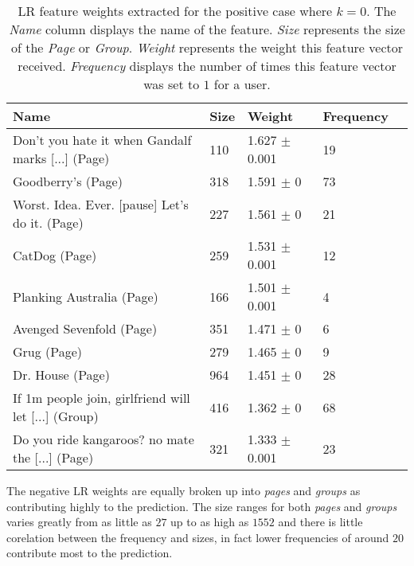 \begin{table}[h]
\begin{minipage}[b]{1.0\textwidth}
\centering
  \begin{tabular}{|l|l|l|l|l|} %
  \hline
  \textbf{Name} & \textbf{Size} & \textbf{Weight} & \textbf{Frequency} \\ \hline

\small{Don't you hate it when Gandalf marks [...] (Page)} & 110 & 1.627 $\pm$ 0.001 & 19 \\ \hline
\small{Goodberry's (Page)} & 318 & 1.591 $\pm$ 0 & 73 \\ \hline
\small{Worst. Idea. Ever. [pause] Let's do it. (Page)} & 227 & 1.561 $\pm$ 0 & 21 \\ \hline
\small{CatDog (Page)} & 259 & 1.531 $\pm$ 0.001 & 12 \\ \hline
\small{Planking Australia (Page)} & 166 & 1.501 $\pm$ 0.001 & 4 \\ \hline
\small{Avenged Sevenfold (Page)} & 351 & 1.471 $\pm$ 0 & 6 \\ \hline
\small{Grug (Page)} & 279 & 1.465 $\pm$ 0 & 9 \\ \hline
\small{Dr. House (Page)} & 964 & 1.451 $\pm$ 0 & 28 \\ \hline
\small{If 1m people join, girlfriend will let [...] (Group)} & 416 & 1.362 $\pm$ 0 & 68 \\ \hline
\small{Do you ride kangaroos? no mate the [...] (Page)} & 321 & 1.333 $\pm$ 0.001 & 23 \\ \hline
  \end{tabular}
  \caption{LR feature weights extracted for the positive case where $k=0$. The \emph{Name} column displays the name of the feature.
                        \emph{Size} represents the size of the \emph{Page} or \emph{Group}.
                        \emph{Weight} represents the weight this feature vector received.  
                        \emph{Frequency} displays the number of times this feature vector was set to $1$ for a user.}
\end{minipage}
\end{table}

The negative LR weights are equally broken up into \emph{pages} and \emph{groups} as contributing highly to the prediction. The size ranges 
for both \emph{pages} and \emph{groups} varies greatly from as little as $27$ up to as high as $1552$ and there is little corelation between 
the frequency and sizes, in fact lower frequencies of around $20$ contribute most to the prediction.

